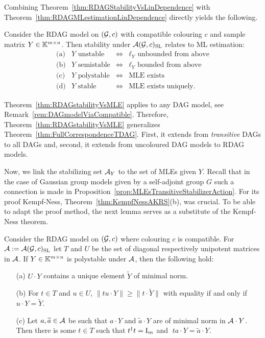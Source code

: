 Combining Theorem~\ref{thm:RDAGStabilityVsLinDependence} with Theorem~\ref{thm:RDAGMLestimationLinDependence} directly yields the following.

\begin{theorem} \label{thm:RDAGstabilityVsMLE}
	Consider the RDAG model on $(\mathcal{G}, c)$ with compatible colouring $c$ and sample matrix $Y \in \mathbb K^{m \times n}$. Then stability under $\mathcal{A}(\mathcal{G}, c)_{\operatorname{SL}}$ relates to ML estimation:
	\[ \begin{matrix}
		\text{(a)} & Y \text{ unstable} &  \Leftrightarrow &  \ell_Y \text{ unbounded from above} \\ 
		\text{(b)} & Y \text{ semistable} & \Leftrightarrow & \ell_Y \text{ bounded from above} \\
		\text{(c)} & Y \text{ polystable} & \Leftrightarrow & \text{MLE exists} \\
		\text{(d)} & Y \text{ stable}  & \Leftrightarrow & \text{MLE exists uniquely.}
	\end{matrix} \]
\end{theorem}

Theorem~\ref{thm:RDAGstabilityVsMLE} applies to any DAG model, see Remark~\ref{rem:DAGmodelViaCompatible}. Therefore, Theorem~\ref{thm:RDAGstabilityVsMLE} generalizes Theorem~\ref{thm:FullCorrespondenceTDAG}. First, it extends from \emph{transitive} DAGs to all DAGs and, second, it extends from uncoloured DAG models to RDAG models.

Now, we link the stabilizing set $\mathcal{A}_Y$ to the set of MLEs given $Y$. Recall that  in the case of Gaussian group models given by a self-adjoint group $G$ such a connection is made in Proposition~\ref{prop:MLEsTransitiveStabilizerAction}. For its proof Kempf-Ness, Theorem~\ref{thm:KempfNessAKRS}(b), was crucial.
To be able to adapt the proof method, the next lemma serves as a substitute of the Kempf-Ness theorem.

\begin{lemma} \label{lem:twoStepRDAG}
	Consider the RDAG model on $(\mathcal{G}, c)$ where colouring $c$ is compatible. For $\mathcal{A} := \mathcal{A}(\mathcal{G}, c)_{\operatorname{SL}}$ let $T$ and $U$ be the set of diagonal respectively unipotent matrices in $\mathcal{A}$. If $Y \in \mathbb K^{m \times n}$ is polystable under $\mathcal{A}$, then the following hold:
	\begin{itemize}
		\item[(a)] $U \cdot Y$ contains a unique element $\widetilde{Y}$ of minimal norm.
		\item[(b)] For $t \in T$ and $u \in U$, $\|tu \cdot Y\| \geq \|t \cdot \widetilde{Y} \|$ with equality if and only if $u \cdot Y = \widetilde{Y}$.
		\item[(c)]  Let $a, \widetilde{a} \in \mathcal{A}$ be such that $a \cdot Y$ and $\widetilde{a} \cdot Y$ are of minimal norm in $\mathcal{A} \cdot Y$. Then there is some $t \in T$ such that $t^{\dagger} t = \operatorname{I}_m$ and $\;ta \cdot Y = \widetilde{a} \cdot Y$.
	\end{itemize}
\end{lemma}

